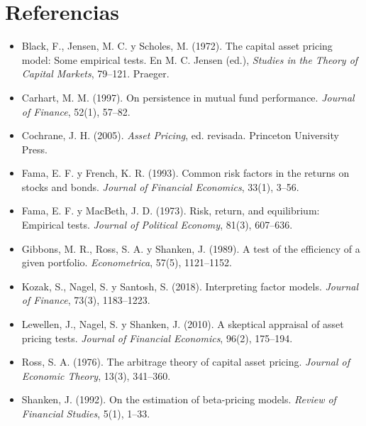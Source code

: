 \section*{Referencias}
\begin{itemize}[leftmargin=*]
  \item Black, F., Jensen, M. C. y Scholes, M. (1972). The capital asset pricing model: Some empirical tests. En M. C. Jensen
        (ed.), \emph{Studies in the Theory of Capital Markets}, 79--121. Praeger.
  \item Carhart, M. M. (1997). On persistence in mutual fund performance. \emph{Journal of Finance}, 52(1), 57--82.
  \item Cochrane, J. H. (2005). \emph{Asset Pricing}, ed. revisada. Princeton University Press.
  \item Fama, E. F. y French, K. R. (1993). Common risk factors in the returns on stocks and bonds. \emph{Journal of Financial
        Economics}, 33(1), 3--56.
  \item Fama, E. F. y MacBeth, J. D. (1973). Risk, return, and equilibrium: Empirical tests. \emph{Journal of Political
        Economy}, 81(3), 607--636.
  \item Gibbons, M. R., Ross, S. A. y Shanken, J. (1989). A test of the efficiency of a given portfolio. \emph{Econometrica},
        57(5), 1121--1152.
  \item Kozak, S., Nagel, S. y Santosh, S. (2018). Interpreting factor models. \emph{Journal of Finance}, 73(3), 1183--1223.
  \item Lewellen, J., Nagel, S. y Shanken, J. (2010). A skeptical appraisal of asset pricing tests. \emph{Journal of Financial
        Economics}, 96(2), 175--194.
  \item Ross, S. A. (1976). The arbitrage theory of capital asset pricing. \emph{Journal of Economic Theory}, 13(3), 341--360.
  \item Shanken, J. (1992). On the estimation of beta-pricing models. \emph{Review of Financial Studies}, 5(1), 1--33.
\end{itemize}
